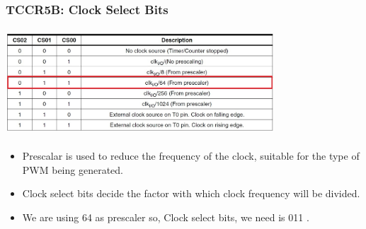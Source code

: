 \documentclass[table,10pt,red]{beamer}	%
\begin{document}
\begin{frame}
	\frametitle{TCCR5B: Clock Select Bits}
	\begin{center}
		\includegraphics[height=4cm, width=10cm]{cs_bits}
		\begin{itemize}
			\item <+-|alert@+> Prescalar is used to reduce the frequency of the clock, suitable for the type of PWM being generated.
			\item <+-|alert@+> Clock select bits decide the factor with which clock frequency will be divided.
			\item <+-|alert@+> We are using 64 as prescaler so, Clock select bits, we need is 011 .			
		\end{itemize}
	\end{center}
\end{frame}
%		
%		
%		
%		
%		
%		
%		
\end{document}
